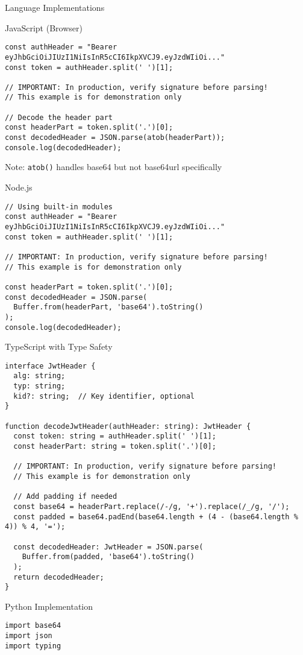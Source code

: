 \documentclass[presentation,aspectratio=169]{beamer}
\begin{document}
\begin{frame}[label={sec:org522ed70},fragile]{Language Implementations}
 \begin{block}{JavaScript (Browser) 🧩}
\begin{verbatim}
const authHeader = "Bearer eyJhbGciOiJIUzI1NiIsInR5cCI6IkpXVCJ9.eyJzdWIiOi..."
const token = authHeader.split(' ')[1];

// IMPORTANT: In production, verify signature before parsing!
// This example is for demonstration only

// Decode the header part
const headerPart = token.split('.')[0];
const decodedHeader = JSON.parse(atob(headerPart));
console.log(decodedHeader);
\end{verbatim}

\alert{Note}: \texttt{atob()} handles base64 but not base64url specifically
\end{block}
\begin{block}{Node.js 🧩}
\begin{verbatim}
// Using built-in modules
const authHeader = "Bearer eyJhbGciOiJIUzI1NiIsInR5cCI6IkpXVCJ9.eyJzdWIiOi..."
const token = authHeader.split(' ')[1];

// IMPORTANT: In production, verify signature before parsing!
// This example is for demonstration only

const headerPart = token.split('.')[0];
const decodedHeader = JSON.parse(
  Buffer.from(headerPart, 'base64').toString()
);
console.log(decodedHeader);
\end{verbatim}
\end{block}
\begin{block}{TypeScript with Type Safety 🧩}
\begin{verbatim}
interface JwtHeader {
  alg: string;
  typ: string;
  kid?: string;  // Key identifier, optional
}

function decodeJwtHeader(authHeader: string): JwtHeader {
  const token: string = authHeader.split(' ')[1];
  const headerPart: string = token.split('.')[0];

  // IMPORTANT: In production, verify signature before parsing!
  // This example is for demonstration only

  // Add padding if needed
  const base64 = headerPart.replace(/-/g, '+').replace(/_/g, '/');
  const padded = base64.padEnd(base64.length + (4 - (base64.length % 4)) % 4, '=');

  const decodedHeader: JwtHeader = JSON.parse(
    Buffer.from(padded, 'base64').toString()
  );
  return decodedHeader;
}
\end{verbatim}
\end{block}
\begin{block}{Python Implementation 🧩}
\begin{verbatim}
import base64
import json
import typing


\end{verbatim}
\end{block}
\end{frame}
\end{document}
